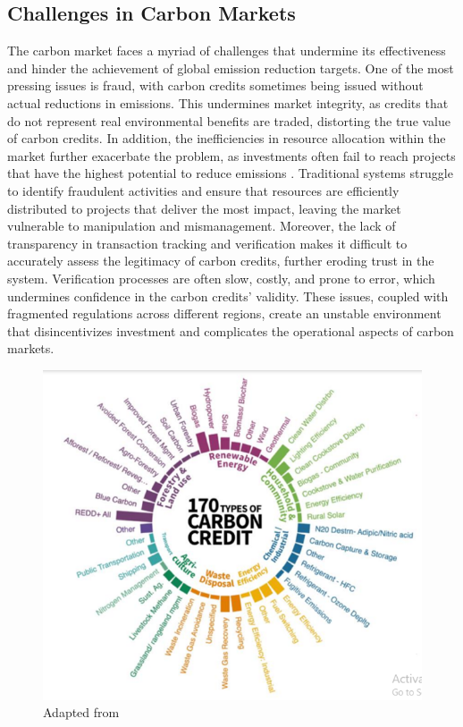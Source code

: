 \documentclass[preprint,12pt]{elsarticle}
\begin{document}
\subsection{Challenges in Carbon Markets}
The carbon market faces a myriad of challenges that undermine its effectiveness and hinder the achievement of global emission reduction targets. One of the most pressing issues is fraud, with carbon credits sometimes being issued without actual reductions in emissions. This undermines market integrity, as credits that do not represent real environmental benefits are traded, distorting the true value of carbon credits. In addition, the inefficiencies in resource allocation within the market further exacerbate the problem, as investments often fail to reach projects that have the highest potential to reduce emissions \citep{padmavathi2024blockchain}. Traditional systems struggle to identify fraudulent activities and ensure that resources are efficiently distributed to projects that deliver the most impact, leaving the market vulnerable to manipulation and mismanagement. Moreover, the lack of transparency in transaction tracking and verification makes it difficult to accurately assess the legitimacy of carbon credits, further eroding trust in the system. Verification processes are often slow, costly, and prone to error, which undermines confidence in the carbon credits' validity. These issues, coupled with fragmented regulations across different regions, create an unstable environment that disincentivizes investment and complicates the operational aspects of carbon markets\citep{boumaiza2024leveraging}.\\
\begin{figure}[ht!]
    \centering
    \includegraphics[width=0.8\linewidth]{fig/fig1-1a.png}
    \caption{Adapted from \citep{donofrio2022art}}
    \label{fig:fig1-1a}
\end{figure}
\end{document}

